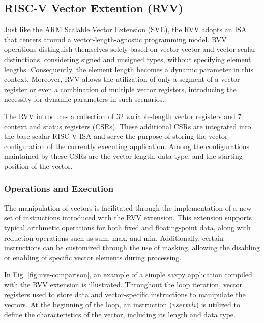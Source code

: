 \subsection{RISC-V Vector Extention (RVV)}
\label{label:rvv}

Just like the ARM Scalable Vector Extension (SVE), the \acrfull{RVV} adopts an \acrfull{ISA} that centers around a vector-length-agnostic programming model. \acrshort{RVV} operations distinguish themselves solely based on vector-vector and vector-scalar distinctions, considering signed and unsigned types, without specifying element lengths. Consequently, the element length becomes a dynamic parameter in this context. Moreover, \acrshort{RVV} allows the utilization of only a segment of a vector register or even a combination of multiple vector registers, introducing the necessity for dynamic parameters in such scenarios.


The \acrlong{RVV} introduces a collection of 32 variable-length vector registers and 7 context and status registers (CSRs). These additional CSRs are integrated into the base scalar RISC-V ISA and serve the purpose of storing the vector configuration of the currently executing application. Among the configurations maintained by these CSRs are the vector length, data type, and the starting position of the vector.

\subsubsection{Operations and Execution}

The manipulation of vectors is facilitated through the implementation of a new set of instructions introduced with the \acrshort{RVV} extension. This extension supports typical arithmetic operations for both fixed and floating-point data, along with reduction operations such as sum, max, and min. Additionally, certain instructions can be customized through the use of masking, allowing the disabling or enabling of specific vector elements during processing.

In Fig. \ref{fig:uve-comparison}, an example of a simple saxpy application compiled with the RVV extension is illustrated. Throughout the loop iteration, vector registers used to store data and vector-specific instructions to manipulate the vectors. At the beginning of the loop, an instruction ($vsertvli$) is utilized to define the characteristics of the vector, including its length and data type.






